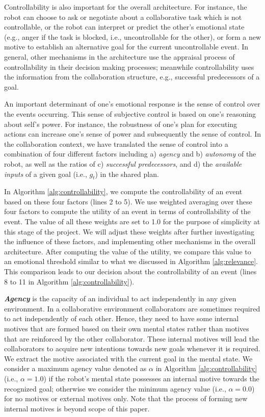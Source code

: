 \documentclass{article}
\begin{document}
Controllability is also important for the overall architecture. For instance,
the robot can choose to ask or negotiate about a collaborative task which is
not controllable, or the robot can interpret or predict the other's emotional
state (e.g., anger if the task is blocked, i.e., uncontrollable for the other),
or form a new motive to establish an alternative goal for the current
uncontrollable event. In general, other mechanisms in the architecture use the
appraisal process of controllability in their decision making processes;
meanwhile controllability uses the information from the collaboration structure,
e.g., successful predecessors of a goal.

An important determinant of one's emotional response is the sense of control
over the events occurring. This sense of subjective control is based on one's
reasoning about self's power. For instance, the robustness of one's plan for
executing actions can increase one's sense of power and subsequently the sense
of control. In the collaboration context, we have translated the sense of control
into a combination of four different factors including a) \textit{agency} and b)
\textit{autonomy} of the robot, as well as the ratios of c) \textit{successful
predecessors}, and d) the \textit{available inputs} of a given goal
(i.e., $\mathit{g}_{t}$) in the shared plan.

In Algorithm \ref{alg:controllability}, we compute the controllability of an
event based on these four factors (lines 2 to 5). We use weighted averaging over
these four factors to compute the utility of an event in terms of
controllability of the event. The value of all these weights are set to 1.0 for
the purpose of simplicity at this stage of the project. We will adjust these
weights after further investigating the influence of these factors, and
implementing other mechanisms in the overall architecture. After computing the
value of the utility, we compare this value to an emotional threshold similar to
what we discussed in Algorithm \ref{alg:relevance}. This comparison leads to our
decision about the controllability of an event (lines 8 to 11 in Algorithm
\ref{alg:controllability}).

\textit{\textbf{Agency}} is the capacity of an individual to act independently
in any given environment. In a collaborative environment collaborators are
sometimes required to act independently of each other. Hence, they need to have
some internal motives that are formed based on their own mental states rather
than motives that are reinforced by the other collaborator. These internal
motives will lead the collaborators to acquire new intentions towards new goals
whenever it is required. We extract the motive associated with the current goal
in the mental state. We consider a maximum agency value denoted as $\alpha$ in
Algorithm \ref{alg:controllability} (i.e., $\alpha=1.0$) if the robot's mental
state possesses an internal motive towards the recognized goal; otherwise we
consider the minimum agency value (i.e., $\alpha=0.0$) for no motives or
external motives only. Note that the process of forming new internal motives is
beyond scope of this paper.
\end{document}
